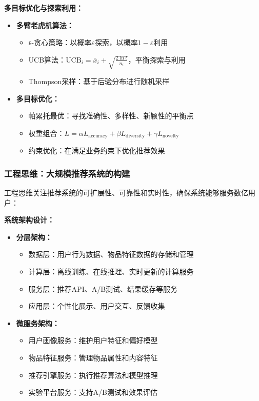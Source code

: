 \textbf{多目标优化与探索利用：}
\begin{itemize}
\item \textbf{多臂老虎机算法：}
\begin{itemize}
\item ε-贪心策略：以概率$\varepsilon$探索，以概率$1-\varepsilon$利用
\item UCB算法：$\text{UCB}_i = \bar{x}_i + \sqrt{\frac{2\ln t}{n_i}}$，平衡探索与利用
\item Thompson采样：基于后验分布进行随机采样
\end{itemize}
\item \textbf{多目标优化：}
\begin{itemize}
\item 帕累托最优：寻找准确性、多样性、新颖性的平衡点
\item 权重组合：$L = \alpha L_{\text{accuracy}} + \beta L_{\text{diversity}} + \gamma L_{\text{novelty}}$
\item 约束优化：在满足业务约束下优化推荐效果
\end{itemize}
\end{itemize}

\subsubsection{工程思维：大规模推荐系统的构建}

工程思维关注推荐系统的可扩展性、可靠性和实时性，确保系统能够服务数亿用户：

\textbf{系统架构设计：}
\begin{itemize}
\item \textbf{分层架构：}
\begin{itemize}
\item 数据层：用户行为数据、物品特征数据的存储和管理
\item 计算层：离线训练、在线推理、实时更新的计算服务
\item 服务层：推荐API、A/B测试、结果缓存等服务
\item 应用层：个性化展示、用户交互、反馈收集
\end{itemize}
\item \textbf{微服务架构：}
\begin{itemize}
\item 用户画像服务：维护用户特征和偏好模型
\item 物品特征服务：管理物品属性和内容特征
\item 推荐引擎服务：执行推荐算法和模型推理
\item 实验平台服务：支持A/B测试和效果评估
\end{itemize}
\end{itemize}

